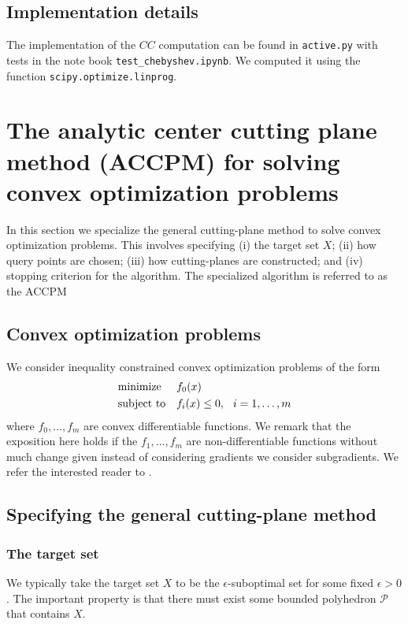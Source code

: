 \documentclass[11pt]{amsart}
\theoremstyle{definition}
\theoremstyle{remark}
\newcommand{\gap}{\hspace*{0.25cm}}
\begin{document}
    \subsection{Implementation details} The implementation of the $CC$ computation can be found in \texttt{active.py} with tests in the note book \texttt{test\_chebyshev.ipynb}. We computed it using the function \texttt{scipy.optimize.linprog}.

\section{The analytic center cutting plane method (ACCPM) for solving convex optimization problems}\label{s:accpm}
    In this section we specialize the general cutting-plane method to solve convex optimization problems. This involves specifying (i) the target set $X$; (ii) how query points are chosen; (iii) how cutting-planes are constructed; and (iv) stopping criterion for the algorithm. The specialized algorithm is referred to as the ACCPM

    \subsection{Convex optimization problems}
        We consider inequality constrained convex optimization problems of the form 
        \begin{equation}\label{e:cvx_opt_problem}
            \begin{aligned}
            & {\text{minimize}} && f_0(x) \\
            & \text{subject to} && f_i(x) \leq 0, \gap i = 1, \dots, m
            \end{aligned}
        \end{equation}
        where $f_0, \dots, f_m$ are convex differentiable functions. We remark that the exposition here holds if the $f_1, \dots, f_m$ are non-differentiable functions without much change given instead of considering gradients we consider subgradients. We refer the interested reader to \cite{BDV15}. 

    \subsection{Specifying the general cutting-plane method}\label{ss:accpm_cp}
        \subsubsection{The target set} We typically take the target set $X$ to be the $\epsilon$-suboptimal set for some fixed $\epsilon > 0$. The important property is that there must exist some bounded polyhedron $\mathcal{P}$ that contains $X$.
\end{document}
